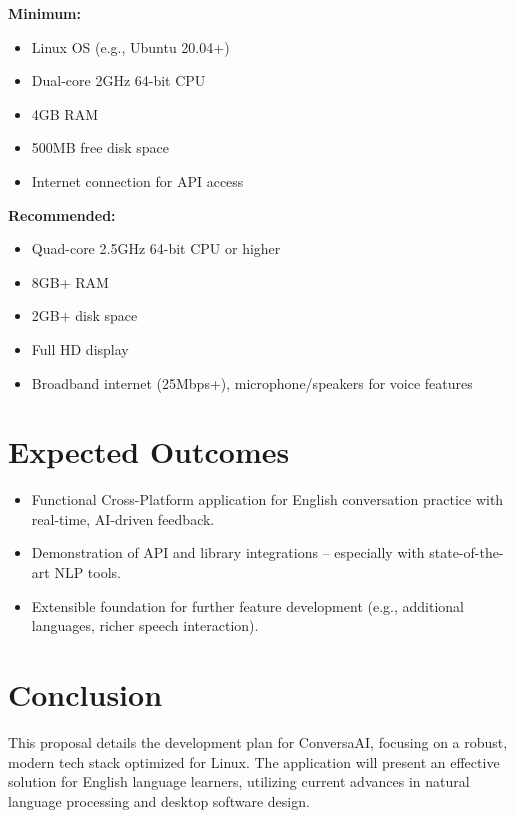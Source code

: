 \documentclass[12pt]{article}
\begin{document}
\noindent \textbf{Minimum:}
\begin{itemize}
    \item Linux OS (e.g., Ubuntu 20.04+)
    \item Dual-core 2GHz 64-bit CPU
    \item 4GB RAM
    \item 500MB free disk space
    \item Internet connection for API access
\end{itemize}

\noindent \textbf{Recommended:}
\begin{itemize}
    \item Quad-core 2.5GHz 64-bit CPU or higher
    \item 8GB+ RAM
    \item 2GB+ disk space
    \item Full HD display
    \item Broadband internet (25Mbps+), microphone/speakers for voice features
\end{itemize}

\section*{Expected Outcomes}

\begin{itemize}
    \item Functional Cross-Platform application for English conversation practice with real-time, AI-driven feedback.
    \item Demonstration of API and library integrations -- especially with state-of-the-art NLP tools.
    \item Extensible foundation for further feature development (e.g., additional languages, richer speech interaction).
\end{itemize}

\section*{Conclusion}

This proposal details the development plan for ConversaAI, focusing on a robust, modern tech stack optimized for Linux. The application will present an effective solution for English language learners, utilizing current advances in natural language processing and desktop software design.
\end{document}
